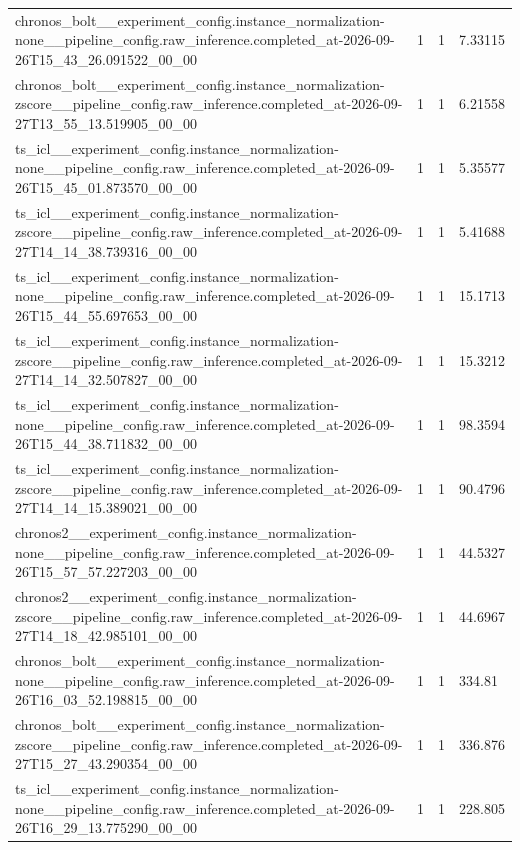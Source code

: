 \begin{tabular}{llll}
chronos\_bolt\_\_experiment\_config.instance\_normalization-none\_\_pipeline\_config.raw\_inference.completed\_at-2026-09-26T15\_43\_26.091522\_00\_00 & 1 & 1 & 7.33115 \\
chronos\_bolt\_\_experiment\_config.instance\_normalization-zscore\_\_pipeline\_config.raw\_inference.completed\_at-2026-09-27T13\_55\_13.519905\_00\_00 & 1 & 1 & 6.21558 \\
ts\_icl\_\_experiment\_config.instance\_normalization-none\_\_pipeline\_config.raw\_inference.completed\_at-2026-09-26T15\_45\_01.873570\_00\_00 & 1 & 1 & 5.35577 \\
ts\_icl\_\_experiment\_config.instance\_normalization-zscore\_\_pipeline\_config.raw\_inference.completed\_at-2026-09-27T14\_14\_38.739316\_00\_00 & 1 & 1 & 5.41688 \\
ts\_icl\_\_experiment\_config.instance\_normalization-none\_\_pipeline\_config.raw\_inference.completed\_at-2026-09-26T15\_44\_55.697653\_00\_00 & 1 & 1 & 15.1713 \\
ts\_icl\_\_experiment\_config.instance\_normalization-zscore\_\_pipeline\_config.raw\_inference.completed\_at-2026-09-27T14\_14\_32.507827\_00\_00 & 1 & 1 & 15.3212 \\
ts\_icl\_\_experiment\_config.instance\_normalization-none\_\_pipeline\_config.raw\_inference.completed\_at-2026-09-26T15\_44\_38.711832\_00\_00 & 1 & 1 & 98.3594 \\
ts\_icl\_\_experiment\_config.instance\_normalization-zscore\_\_pipeline\_config.raw\_inference.completed\_at-2026-09-27T14\_14\_15.389021\_00\_00 & 1 & 1 & 90.4796 \\
chronos2\_\_experiment\_config.instance\_normalization-none\_\_pipeline\_config.raw\_inference.completed\_at-2026-09-26T15\_57\_57.227203\_00\_00 & 1 & 1 & 44.5327 \\
chronos2\_\_experiment\_config.instance\_normalization-zscore\_\_pipeline\_config.raw\_inference.completed\_at-2026-09-27T14\_18\_42.985101\_00\_00 & 1 & 1 & 44.6967 \\
chronos\_bolt\_\_experiment\_config.instance\_normalization-none\_\_pipeline\_config.raw\_inference.completed\_at-2026-09-26T16\_03\_52.198815\_00\_00 & 1 & 1 & 334.81 \\
chronos\_bolt\_\_experiment\_config.instance\_normalization-zscore\_\_pipeline\_config.raw\_inference.completed\_at-2026-09-27T15\_27\_43.290354\_00\_00 & 1 & 1 & 336.876 \\
ts\_icl\_\_experiment\_config.instance\_normalization-none\_\_pipeline\_config.raw\_inference.completed\_at-2026-09-26T16\_29\_13.775290\_00\_00 & 1 & 1 & 228.805 \\

\end{tabular}
